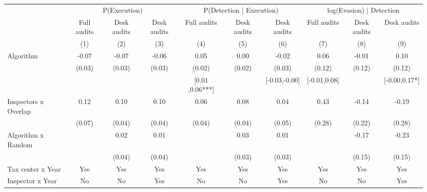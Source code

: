 \begin{tabular}{lccc|ccc|ccc} \toprule
\multicolumn{1}{l}{} & \multicolumn{3}{c}{P(Execution)} & \multicolumn{3}{c}{P(Detection | Execution)} & \multicolumn{3}{c}{log(Evasion) | Detection} \\\cmidrule(lr){2-4}\cmidrule(lr){5-7}\cmidrule(lr){8-10} \multicolumn{1}{l}{} & Full audits & Desk audits & Desk audits & Full audits & Desk audits & Desk audits & Full audits & Desk audits & Desk audits \\ \multicolumn{1}{l}{} & (1) & (2) & (3) & (4) & (5) & (6) & (7) & (8) & (9) \\ \midrule
Algorithm   &       -0.07\sym{*}  &       -0.07\sym{**} &       -0.06\sym{**} &        0.05\sym{**} &        0.00         &       -0.02         &        0.06         &       -0.01         &        0.10         \\
            &      (0.03)         &      (0.03)         &      (0.03)         &      (0.02)         &      (0.02)         &      (0.03)         &      (0.12)         &      (0.12)         &      (0.12)         \\
\addlinespace
 & & & & [0.01 ,0.06***] & & [-0.03,-0.00] & [-0.01,0.08] & & [-0.00,0.17*] \\  Inspectors x Overlap&        0.12\sym{*}  &        0.10\sym{**} &        0.10\sym{**} &        0.06\sym{*}  &        0.08\sym{**} &        0.04         &        0.43         &       -0.14         &       -0.19         \\
            &      (0.07)         &      (0.04)         &      (0.04)         &      (0.04)         &      (0.04)         &      (0.05)         &      (0.28)         &      (0.22)         &      (0.28)         \\
\addlinespace
Algorithm x Random&                     &        0.02         &        0.01         &                     &        0.03         &        0.01         &                     &       -0.17         &       -0.23         \\
            &                     &      (0.04)         &      (0.04)         &                     &      (0.03)         &      (0.03)         &                     &      (0.15)         &      (0.15)         \\
\midrule
Tax center x Year&         Yes         &         Yes         &         Yes         &         Yes         &         Yes         &         Yes         &         Yes         &         Yes         &         Yes         \\
Inspector x Year&          No         &          No         &         Yes         &          No         &          No         &         Yes         &          No         &          No         &         Yes         \\

\end{tabular}
